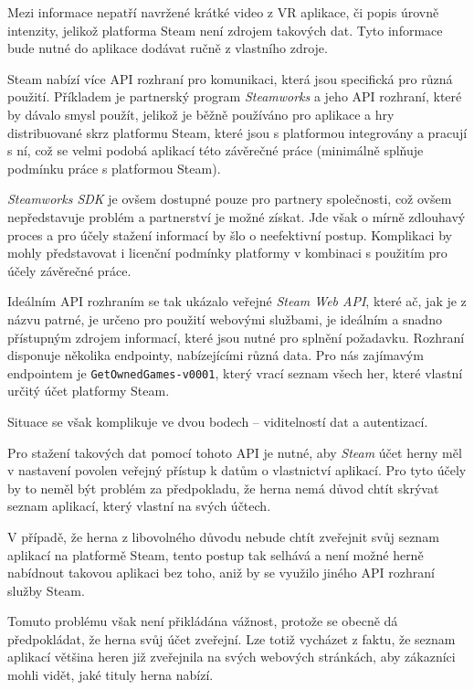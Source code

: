 Mezi informace nepatří navržené krátké video z VR aplikace, či popis úrovně
intenzity, jelikož platforma Steam není zdrojem takových dat. Tyto
informace bude nutné do aplikace dodávat ručně z vlastního zdroje.

Steam nabízí více API rozhraní pro komunikaci, která jsou specifická pro různá
použití. Příkladem je partnerský program \emph{Steamworks} a jeho API rozhraní, 
které by dávalo smysl použít, jelikož je
běžně používáno pro aplikace a hry distribuované skrz platformu Steam,
které jsou s platformou integrovány a pracují s ní, což se velmi podobá
aplikací této závěrečné práce (minimálně splňuje podmínku práce s
platformou Steam). \autocite{steamworks}

\emph{Steamworks SDK} je ovšem dostupné pouze pro
partnery společnosti, což ovšem nepředstavuje problém a partnerství je možné získat. \autocite{steamworkss}
Jde však o mírně zdlouhavý proces a pro účely stažení informací by šlo o
neefektivní postup. Komplikaci by mohly představovat i licenční podmínky
platformy v kombinaci s použitím pro účely závěrečné práce.

Ideálním API rozhraním se tak ukázalo veřejné \emph{Steam Web API},
které ač, jak je z názvu patrné, je určeno pro použití webovými
službami, je ideálním a snadno přístupným zdrojem informací, které jsou
nutné pro splnění požadavku. \autocite{steamwebapi} Rozhraní disponuje několika endpointy,
nabízejícími různá data. Pro nás zajímavým endpointem je
\texttt{GetOwnedGames-v0001}, který vrací seznam všech her, které
vlastní určitý účet platformy Steam. \autocite{swadocs}

Situace se však komplikuje ve dvou bodech -- viditelností dat a
autentizací.

Pro stažení takových dat pomocí tohoto API je nutné, aby \emph{Steam} 
účet herny měl v nastavení povolen veřejný přístup k
datům o vlastnictví aplikací. Pro tyto účely by to neměl být problém za
předpokladu, že herna nemá důvod chtít skrývat seznam aplikací, který vlastní
na svých účtech. 

V případě, že herna z libovolného důvodu nebude chtít
zveřejnit svůj seznam aplikací na platformě Steam, tento postup tak selhává a
není možné herně nabídnout takovou aplikaci bez toho, aniž by se využilo
jiného API rozhraní služby Steam. 

Tomuto problému však není přikládána
vážnost, protože se obecně dá předpokládat, že herna svůj účet zveřejní.
Lze totiž vycházet z faktu, že seznam aplikací většina heren již zveřejnila
na svých webových stránkách, aby zákazníci mohli vidět, jaké tituly
herna nabízí.

